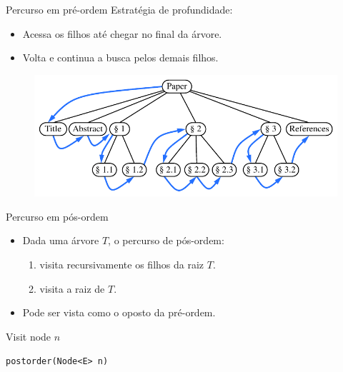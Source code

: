\begin{frame}{Percurso em pré-ordem}
Estratégia de profundidade:
\begin{itemize}
	\item Acessa os filhos até chegar no final da árvore.
	\item Volta e continua a busca pelos demais filhos.
\end{itemize}

\medskip

\begin{figure}
	\centering
	\includegraphics[width=0.75\linewidth]{img/figure-8-13}
\end{figure}
\end{frame}


\begin{frame}{Percurso em pós-ordem}
\begin{itemize}
	\item Dada uma árvore $T$, o percurso de pós-ordem:
	\begin{enumerate}
		\item visita recursivamente os filhos da raiz $T$.
		\item visita a raiz de $T$.
	\end{enumerate}
	\item Pode ser vista como o oposto da pré-ordem.
\end{itemize}

\bigskip
\bigskip

\begin{algorithm}[H]
	\DontPrintSemicolon
	Visit node $n$\;
	
	\caption{\texttt{postorder(Node<E> n)}}
\end{algorithm}

\end{frame}


